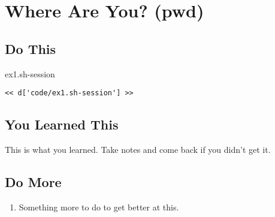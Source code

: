 \chapter{Where Are You? (pwd)}

\section{Do This}

\begin{code}{ex1.sh-session}
\begin{Verbatim}
<< d['code/ex1.sh-session'] >>
\end{Verbatim}
\end{code}


\section{You Learned This}

This is what you learned.  Take notes and come back if you didn't get it.

\section{Do More}

\begin{enumerate}
\item Something more to do to get better at this.
\end{enumerate}

